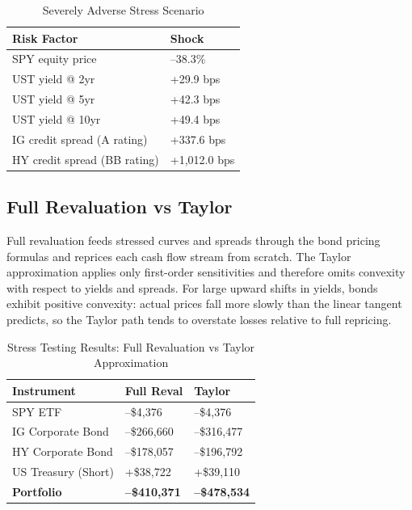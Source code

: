 \documentclass[11pt, a4paper]{article}
\begin{document}
\begin{table}[H]
\centering
\caption{Severely Adverse Stress Scenario}
\begin{tabularx}{\textwidth}{lX}
\toprule
\textbf{Risk Factor} & \textbf{Shock} \\
\midrule
SPY equity price & --38.3\% \\
UST yield @ 2yr & +29.9 bps \\
UST yield @ 5yr & +42.3 bps \\
UST yield @ 10yr & +49.4 bps \\
IG credit spread (A rating) & +337.6 bps \\
HY credit spread (BB rating) & +1,012.0 bps \\
\bottomrule
\end{tabularx}
\end{table}

\subsection{Full Revaluation vs Taylor}

Full revaluation feeds stressed curves and spreads through the bond pricing formulas and reprices each cash flow stream from scratch. The Taylor approximation applies only first-order sensitivities and therefore omits convexity with respect to yields and spreads. For large upward shifts in yields, bonds exhibit positive convexity: actual prices fall more slowly than the linear tangent predicts, so the Taylor path tends to overstate losses relative to full repricing.

\begin{table}[H]
\centering
\caption{Stress Testing Results: Full 
Revaluation vs Taylor Approximation}
\begin{tabularx}{\textwidth}{lXX}
\toprule
\textbf{Instrument} & \textbf{Full Reval} & 
\textbf{Taylor} \\
\midrule
SPY ETF & --\$4,376 & --\$4,376 \\
IG Corporate Bond & --\$266,660 & --\$316,477 \\
HY Corporate Bond & --\$178,057 & --\$196,792 \\
US Treasury (Short) & +\$38,722 & +\$39,110 \\
\midrule
\textbf{Portfolio} & \textbf{--\$410,371} & 
\textbf{--\$478,534} \\
\bottomrule
\end{tabularx}
\end{table}
\end{document}

